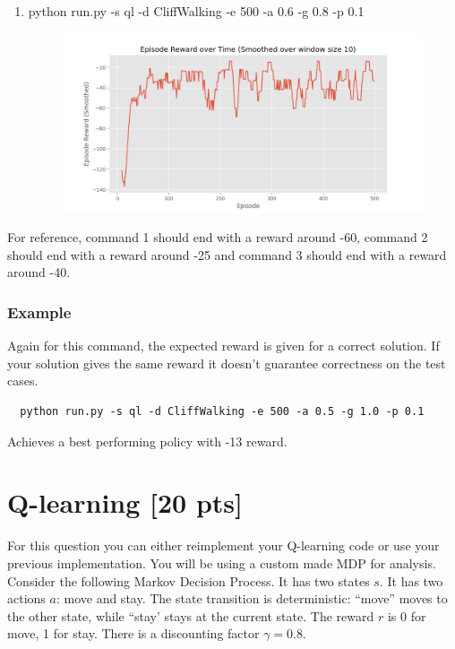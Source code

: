 \documentclass[a4paper]{article}
\theoremstyle{definition}
\begin{document}
\begin{enumerate}
    \item  python run.py -s ql -d CliffWalking -e 500 -a 0.6 -g 0.8 -p 0.1   
            \begin{figure}[H]
                \centering
                \includegraphics[width=6in]{3_3_EROT.png}
                \label{fig:gan_q1_loss}
            \end{figure}
    
\end{enumerate}

For reference, command 1 should end with a reward around -60, command 2 should end with a reward around -25 and command 3 should end with a reward around -40.

\subsubsection*{Example}

Again for this command, the expected reward is given for a correct solution. If your solution gives the same reward it doesn't guarantee correctness on the test cases.

\begin{verbatim}
  python run.py -s ql -d CliffWalking -e 500 -a 0.5 -g 1.0 -p 0.1  
\end{verbatim}

Achieves a best performing policy with -13 reward.

\newpage
\section{Q-learning [20 pts]}
For this question you can either reimplement your Q-learning code or use your previous implementation. You will be using a custom made MDP for analysis. Consider the following Markov Decision Process.
It has two states $s$. It has two actions $a$: move and stay. The state transition is deterministic: ``move'' moves to the other state, while ``stay' stays at the current state. The reward $r$ is 0 for move,  1 for stay. There is a discounting factor $\gamma=0.8$.
\\
\end{document}
